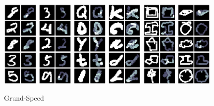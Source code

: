 \begin{figure}[!ht]
    \centering
    \includegraphics[width=0.32\textwidth]{images/resultate/base-speed-mnist.png}
    \includegraphics[width=0.32\textwidth]{images/resultate/base-speed-emnist.png}
    \includegraphics[width=0.32\textwidth]{images/resultate/base-speed-quickdraw.png}
    \caption{Grund-Speed}
    \label{fig:Grund-Speed}
\end{figure}

